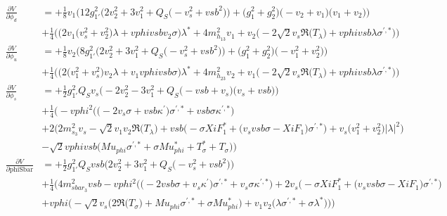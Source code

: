 \begin{align} 
\frac{\partial V}{\partial \phi_{d}} &= +\frac{1}{8} v_1 \Big(12 g_{1'}^{2} \Big(2 v_{2}^{2}  + 3 v_{1}^{2}  + Q_{S} \Big(- v_{s}^{2}  + vsb^{2}\Big)\Big) + \Big(g_{1}^{2} + g_{2}^{2}\Big)\Big(- v_2  + v_1\Big)\Big(v_1 + v_2\Big)\Big)\nonumber \\ 
 &+\frac{1}{4} \Big(\Big(2 v_1 \Big(v_{s}^{2} + v_{2}^{2}\Big)\lambda  + vphi vsb v_2 \sigma \Big)\lambda^*  + 4 m_{h_{13}}^2 v_1  + v_2 \Big(-2 \sqrt{2} v_s {\Re\Big(T_{\lambda}\Big)}  + vphi vsb \lambda \sigma^{\prime,*} \Big)\Big)\\ 
\frac{\partial V}{\partial \phi_{u}} &= +\frac{1}{8} v_2 \Big(8 g_{1'}^{2} \Big(2 v_{2}^{2}  + 3 v_{1}^{2}  + Q_{S} \Big(- v_{s}^{2}  + vsb^{2}\Big)\Big) + \Big(g_{1}^{2} + g_{2}^{2}\Big)\Big(- v_{1}^{2}  + v_{2}^{2}\Big)\Big)\nonumber \\ 
 &+\frac{1}{4} \Big(\Big(2 \Big(v_{1}^{2} + v_{s}^{2}\Big)v_2 \lambda  + v_1 vphi vsb \sigma \Big)\lambda^*  + 4 m_{h_{23}}^2 v_2  + v_1 \Big(-2 \sqrt{2} v_s {\Re\Big(T_{\lambda}\Big)}  + vphi vsb \lambda \sigma^{\prime,*} \Big)\Big)\\ 
\frac{\partial V}{\partial \phi_s} &= +\frac{1}{2} g_{1'}^{2} Q_{S} v_s \Big(-2 v_{2}^{2}  -3 v_{1}^{2}  + Q_{S} \Big(- vsb  + v_s\Big)\Big(v_s + vsb\Big)\Big)\nonumber \\ 
 &+\frac{1}{4} \Big(- vphi^{2} \Big(\Big(-2 v_s \sigma  + vsb \kappa^\prime \Big)\sigma^{\prime,*}  + vsb \sigma \kappa^{\prime,*} \Big)\nonumber \\ 
 &+2 \Big(2 m_{s_3}^2 v_s  - \sqrt{2} v_1 v_2 {\Re\Big(T_{\lambda}\Big)}  + vsb \Big(- \sigma XiF_1^*  + \Big(v_s vsb \sigma  - XiF_1 \Big)\sigma^{\prime,*} \Big) + v_s \Big(v_{1}^{2} + v_{2}^{2}\Big)|\lambda|^2 \Big)\nonumber \\ 
 &- \sqrt{2} vphi vsb \Big(Mu_{phi} \sigma^{\prime,*}  + \sigma Mu_{phi}^*  + T_{\sigma}^* + T_{\sigma}\Big)\Big)\\ 
\frac{\partial V}{\partial \text{phiSbar}} &= +\frac{1}{2} g_{1'}^{2} Q_{S} vsb \Big(2 v_{2}^{2}  + 3 v_{1}^{2}  + Q_{S} \Big(- v_{s}^{2}  + vsb^{2}\Big)\Big)\nonumber \\ 
 &+\frac{1}{4} \Big(4 m_{sbar_3}^2 vsb - vphi^{2} \Big(\Big(-2 vsb \sigma  + v_s \kappa^\prime \Big)\sigma^{\prime,*}  + v_s \sigma \kappa^{\prime,*} \Big)+2 v_s \Big(- \sigma XiF_1^*  + \Big(v_s vsb \sigma  - XiF_1 \Big)\sigma^{\prime,*} \Big)\nonumber \\ 
 &+vphi \Big(- \sqrt{2} v_s \Big(2 {\Re\Big(T_{\sigma}\Big)}  + Mu_{phi} \sigma^{\prime,*}  + \sigma Mu_{phi}^* \Big) + v_1 v_2 \Big(\lambda \sigma^{\prime,*}  + \sigma \lambda^* \Big)\Big)\Big)\\ 

\end{align}
